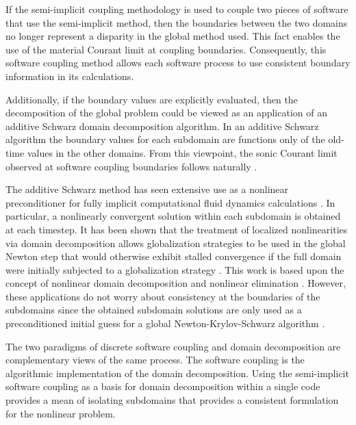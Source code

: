 If the semi-implicit coupling methodology is used to couple two pieces of software that use the semi-implicit method, then the boundaries between the two domains no longer represent a disparity in the global method used.
This fact enables the use of the material Courant limit at coupling boundaries.
Consequently, this software coupling method allows each software process to use consistent boundary information in its calculations.

Additionally, if the boundary values are explicitly evaluated, then the decomposition of the global problem could be viewed as an application of an additive Schwarz domain decomposition algorithm.
In an additive Schwarz algorithm the boundary values for each subdomain are functions only of the old-time values in the other domains.
From this viewpoint, the sonic Courant limit observed at software coupling boundaries follows naturally \cite{Aumiller2001}.

The additive Schwarz method has seen extensive use as a nonlinear preconditioner for fully implicit computational fluid dynamics calculations \cite{Cai2009, Cai2002}.
In particular, a nonlinearly convergent solution within each subdomain is obtained at each timestep.
It has been shown that the treatment of localized nonlinearities via domain decomposition allows globalization strategies to be used in the global Newton step that would otherwise exhibit stalled convergence if the full domain were initially subjected to a globalization strategy \cite{Cai2011}.
This work is based upon the concept of nonlinear domain decomposition and nonlinear elimination \cite{Lanzkron1996, Dryja1997}.
However, these applications do not worry about consistency at the boundaries of the subdomains since the obtained subdomain solutions are only used as a preconditioned initial guess for a global Newton-Krylov-Schwarz algorithm \cite{Chan1984}.

The two paradigms of discrete software coupling and domain decomposition are complementary views of the same process.
The software coupling is the algorithmic implementation of the domain decomposition.
Using the semi-implicit software coupling as a basis for domain decomposition within a single code provides a mean of isolating subdomains that provides a consistent formulation for the nonlinear problem.